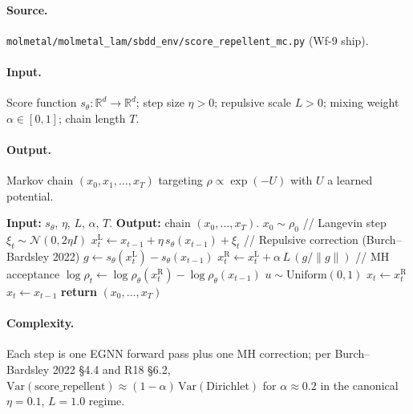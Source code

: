 \paragraph{Source.}
\texttt{molmetal/molmetal\_lam/sbdd\_env/score\_repellent\_mc.py}
(Wf-9 ship).

\paragraph{Input.}
Score function $s_{\theta} : \mathbb{R}^{d} \to \mathbb{R}^{d}$;
step size $\eta > 0$; repulsive scale $L > 0$; mixing weight
$\alpha \in [0, 1]$; chain length $T$.

\paragraph{Output.}
Markov chain $(x_{0}, x_{1}, \ldots, x_{T})$ targeting
$\rho \propto \exp(-U)$ with $U$ a learned potential.

\begin{algorithmic}[1]
  \STATE \textbf{Input:} $s_{\theta}$, $\eta$, $L$, $\alpha$, $T$.
  \STATE \textbf{Output:} chain $(x_{0}, \ldots, x_{T})$.
  \STATE $x_{0} \sim \rho_{0}$
    \STATE // Langevin step
    \STATE $\xi_{t} \sim \mathcal{N}(0, 2 \eta I)$
    \STATE $x_{t}^{\mathrm{L}} \gets x_{t-1} + \eta\, s_{\theta}(x_{t-1}) + \xi_{t}$
    \STATE // Repulsive correction (Burch--Bardsley 2022)
    \STATE $g \gets s_{\theta}(x_{t}^{\mathrm{L}}) - s_{\theta}(x_{t-1})$
    \STATE $x_{t}^{\mathrm{R}} \gets x_{t}^{\mathrm{L}} + \alpha\, L\, (g / \|g\|)$
    \STATE // MH acceptance
    \STATE $\log \rho_{t} \gets \log \rho_{\theta}(x_{t}^{\mathrm{R}}) -
                            \log \rho_{\theta}(x_{t-1})$
    \STATE $u \sim \mathrm{Uniform}(0, 1)$
      \STATE $x_{t} \gets x_{t}^{\mathrm{R}}$
    \ELSE
      \STATE $x_{t} \gets x_{t-1}$
    \ENDIF
  \ENDFOR
  \STATE \textbf{return} $(x_{0}, \ldots, x_{T})$
\end{algorithmic}

\paragraph{Complexity.}
Each step is one EGNN forward pass plus one MH correction; per
Burch--Bardsley 2022 \S 4.4 and R18 \S 6.2,
$\mathrm{Var}(\mathrm{score\_repellent}) \approx (1 - \alpha)\,
\mathrm{Var}(\mathrm{Dirichlet})$ for $\alpha \approx 0.2$ in the
canonical $\eta = 0.1$, $L = 1.0$ regime.

